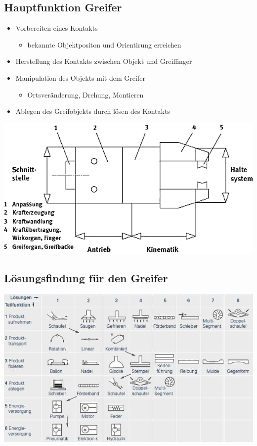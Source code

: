 \subsection{Hauptfunktion Greifer}
\begin{minipage}{0.5\linewidth}
\begin{itemize}
    \item Vorbereiten eines Kontakts
    \begin{itemize}
        \item bekannte Objektpositon und Orientirung erreichen
    \end{itemize}
    \item Herstellung des Kontakts zwischen Objekt und Greiffinger
    \item Manipulation des Objekts mit dem Greifer
        \begin{itemize}
        \item Ortsveränderung, Drehung, Montieren
    \end{itemize}
    \item Ablegen des Greifobjekts durch lösen des Kontakts
\end{itemize}
\end{minipage}
\begin{minipage}{0.5\linewidth}
    \includegraphics[width=\linewidth]{./bilder/Greifer}
\end{minipage}
\begin{minipage}{\linewidth}
    \subsection{Lösungsfindung für den Greifer}
    \includegraphics[width=0.9\linewidth]{./bilder/GreiferLosung}
\end{minipage}

